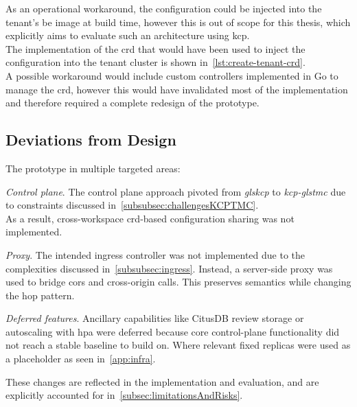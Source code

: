 \documentclass[11pt, a4paper, oneside, listof=totoc]{scrartcl}
\begin{document}
                As an operational workaround, the configuration could be injected into the tenant's
                \gls{be} image at build time, however this is out of scope for this thesis, which
                explicitly aims to evaluate such an architecture using \gls{kcp}.\\
                The implementation of the \gls{crd} that would have been used to inject the
                configuration into the tenant cluster is shown in~\autoref{lst:create-tenant-crd}.\\
                A possible workaround would include custom controllers implemented in Go to manage
                the \gls{crd}, however this would have invalidated most of the implementation and
                therefore required a complete redesign of the prototype.

        \subsection{Deviations from Design}\label{subsec:deviationsFromDesign}
            The prototype in multiple targeted areas:
            \begin{enumerate}[label={[\arabic*]:},
                    ref=Challenge~\arabic*,
                    leftmargin=*,
                    itemsep=0.6\baselineskip]

                    \item\label{chal:controlPlane}
                        \textit{Control plane}.
                        The control plane approach pivoted from \emph{gls{kcp}} to
                        \emph{\gls{kcp}-gls{tmc}} due to constraints discussed
                        in~\autoref{subsubsec:challengesKCPTMC}.\\
                        As a result, cross-workspace \gls{crd}-based configuration sharing was not
                        implemented.

                    \item\label{chal:proxy}
                        \textit{Proxy}.
                        The intended ingress controller was not implemented due to the
                        complexities discussed in~\autoref{subsubsec:ingress}.
                        Instead, a server-side proxy was used to bridge \gls{cors} and
                        cross-origin calls.
                        This preserves semantics while changing the hop pattern.

                    \item\label{chal:deferredFeatures}
                        \textit{Deferred features}.
                        Ancillary capabilities like CitusDB review storage or autoscaling with
                        \gls{hpa} were deferred because core control-plane functionality did not
                        reach a stable baseline to build on.
                        Where relevant fixed replicas were used as a placeholder as seen
                        in~\autoref{app:infra}.

            \end{enumerate}
            These changes are reflected in the implementation and evaluation, and are explicitly
            accounted for in~\autoref{subsec:limitationsAndRisks}.
\end{document}
